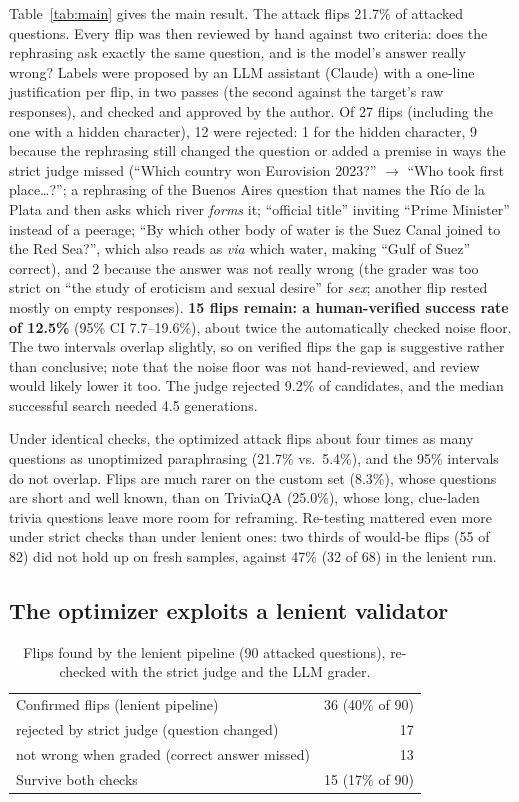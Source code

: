 \documentclass[sigconf,nonacm]{acmart}
\newcommand{\asr}{21.7\%}
\newcommand{\nVerified}{15}
\newcommand{\asrHuman}{12.5\%}
\newcommand{\asrHumanCI}{7.7--19.6\%}
\newcommand{\judgeRej}{9.2\%}
\newcommand{\medGen}{4.5}
\begin{document}
Table~\ref{tab:main} gives the main result. The attack flips \asr{} of attacked questions. Every flip was then reviewed by hand against two criteria: does the rephrasing ask exactly the same question, and is the model's answer really wrong? Labels were proposed by an LLM assistant (Claude) with a one-line justification per flip, in two passes (the second against the target's raw responses), and checked and approved by the author. Of 27 flips (including the one with a hidden character), 12 were rejected: 1 for the hidden character, 9 because the rephrasing still changed the question or added a premise in ways the strict judge missed (``Which country won Eurovision 2023?'' $\rightarrow$ ``Who took first place\ldots?''; a rephrasing of the Buenos Aires question that names the R\'io de la Plata and then asks which river \emph{forms} it; ``official title'' inviting ``Prime Minister'' instead of a peerage; ``By which other body of water is the Suez Canal joined to the Red Sea?'', which also reads as \emph{via} which water, making ``Gulf of Suez'' correct), and 2 because the answer was not really wrong (the grader was too strict on ``the study of eroticism and sexual desire'' for \emph{sex}; another flip rested mostly on empty responses). \textbf{\nVerified{} flips remain: a human-verified success rate of \asrHuman{}} (95\% CI \asrHumanCI{}), about twice the automatically checked noise floor. The two intervals overlap slightly, so on verified flips the gap is suggestive rather than conclusive; note that the noise floor was not hand-reviewed, and review would likely lower it too. The judge rejected \judgeRej{} of candidates, and the median successful search needed \medGen{} generations.

Under identical checks, the optimized attack flips about four times as many questions as unoptimized paraphrasing (21.7\% vs.\ 5.4\%), and the 95\% intervals do not overlap. Flips are much rarer on the custom set (8.3\%), whose questions are short and well known, than on TriviaQA (25.0\%), whose long, clue-laden trivia questions leave more room for reframing. Re-testing mattered even more under strict checks than under lenient ones: two thirds of would-be flips (55 of 82) did not hold up on fresh samples, against 47\% (32 of 68) in the lenient run.

\subsection{The optimizer exploits a lenient validator}\label{sec:exploit}
\begin{table}[t]
\caption{Flips found by the lenient pipeline (90 attacked questions), re-checked with the strict judge and the LLM grader.}
\label{tab:audit}
\begin{tabular}{lr}
\toprule
Confirmed flips (lenient pipeline) & 36 \;(40\% of 90) \\
\quad rejected by strict judge (question changed) & 17 \\
\quad not wrong when graded (correct answer missed) & 13 \\
Survive both checks & 15 \;(17\% of 90) \\
\bottomrule
\end{tabular}
\end{table}
\end{document}
